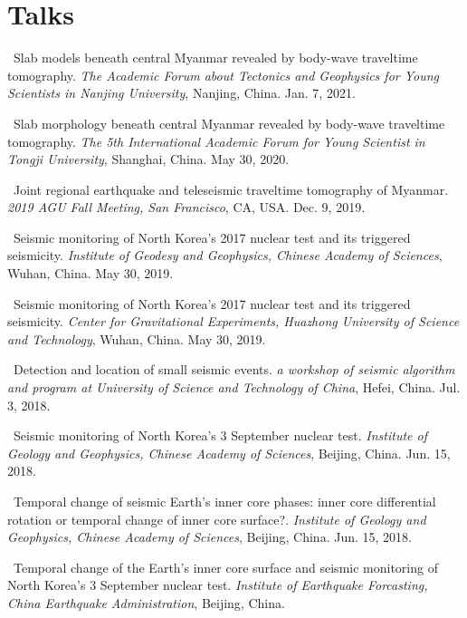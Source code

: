 \section*{Talks}
\begin{etaremune}
\item
    \Yao\
    Slab models beneath central Myanmar revealed by body-wave traveltime tomography.
    \textit{The Academic Forum about Tectonics and Geophysics for Young Scientists in Nanjing University}, Nanjing, China.
    Jan. 7, 2021.
\item
    \Yao\
    Slab morphology beneath central Myanmar revealed by body-wave traveltime tomography.
    \textit{The 5th International Academic Forum for Young Scientist in Tongji University}, Shanghai, China.
    May 30, 2020.
\item
    \Yao\
    Joint regional earthquake and teleseismic traveltime tomography of Myanmar.
    \textit{2019 AGU Fall Meeting, San Francisco}, CA, USA.
    Dec. 9, 2019.
\item
    \Yao\
    Seismic monitoring of North Korea's 2017 nuclear test and its triggered seismicity.
    \textit{Institute of Geodesy and Geophysics, Chinese Academy of Sciences}, Wuhan, China.
    May 30, 2019.
    \invited
\item
    \Yao\
    Seismic monitoring of North Korea's 2017 nuclear test and its triggered seismicity.
    \textit{Center for Gravitational Experiments, Huazhong University of Science and Technology}, Wuhan, China.
    May 30, 2019.
\item
    \Yao\
    Detection and location of small seismic events.
    \textit{a workshop of seismic algorithm and program at University of Science and Technology of China}, Hefei, China.
    Jul. 3, 2018.
    \invited
\item
    \Yao\
    Seismic monitoring of North Korea's 3 September nuclear test.
    \textit{Institute of Geology and Geophysics, Chinese Academy of Sciences}, Beijing, China.
    Jun. 15, 2018.
    \invited
\item
    \Yao\
    Temporal change of seismic Earth's inner core phases: inner core differential rotation or temporal change of inner core surface?.
    \textit{Institute of Geology and Geophysics, Chinese Academy of Sciences}, Beijing, China.
    Jun. 15, 2018.
    \invited
\item
    \Yao\
    Temporal change of the Earth's inner core surface and seismic monitoring of North Korea's 3 September nuclear test.
    \textit{Institute of Earthquake Forcasting, China Earthquake Administration}, Beijing, China.

\end{etaremune}
